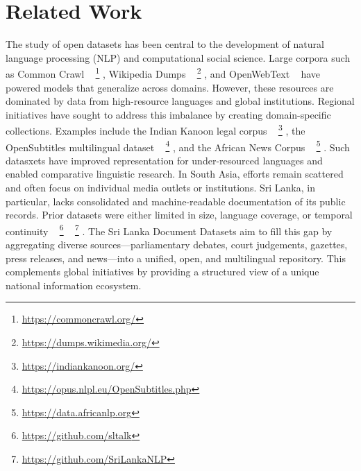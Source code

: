 \documentclass[10pt,a4paper]{article}%
\begin{document}
%
\section{Related Work}%
\label{sec:RelatedWork}%
The study of open datasets has been central to the development of natural language processing (NLP) and computational social science. Large corpora such as Common Crawl%
~%
\footnote{\href{https://commoncrawl.org/}{https://commoncrawl.org/}}%
, Wikipedia Dumps%
~%
\footnote{\href{https://dumps.wikimedia.org/}{https://dumps.wikimedia.org/}}%
, and OpenWebText%
~%
\citep{openwebtext2019}%
have powered models that generalize across domains. However, these resources are dominated by data from high-resource languages and global institutions.%
Regional initiatives have sought to address this imbalance by creating domain-specific collections. Examples include the Indian Kanoon legal corpus%
~%
\footnote{\href{https://indiankanoon.org/}{https://indiankanoon.org/}}%
, the OpenSubtitles multilingual dataset%
~%
\footnote{\href{https://opus.nlpl.eu/OpenSubtitles.php}{https://opus.nlpl.eu/OpenSubtitles.php}}%
, and the African News Corpus%
~%
\footnote{\href{https://data.africanlp.org}{https://data.africanlp.org}}%
. Such datasxets have improved representation for under-resourced languages and enabled comparative linguistic research.%
In South Asia, efforts remain scattered and often focus on individual media outlets or institutions. Sri Lanka, in particular, lacks consolidated and machine-readable documentation of its public records. Prior datasets were either limited in size, language coverage, or temporal continuity%
~%
\footnote{\href{https://github.com/sltalk}{https://github.com/sltalk}}%
%
~%
\footnote{\href{https://github.com/SriLankaNLP}{https://github.com/SriLankaNLP}}%
.%
The Sri Lanka Document Datasets aim to fill this gap by aggregating diverse sources—parliamentary debates, court judgements, gazettes, press releases, and news—into a unified, open, and multilingual repository. This complements global initiatives by providing a structured view of a unique national information ecosystem.

%
\end{document}
